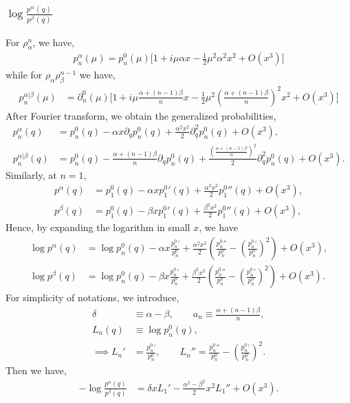 \documentclass[11pt]{article}
\newcommand{\p}{\partial}
\newcommand{\lb}{\left(}
\newcommand{\rb}{\right)}
\begin{document}
\subsubsection{\texorpdfstring{$\log \frac{p^\alpha(q)}{p^\beta(q)}$}{ log p alpha / p beta}}
For $\rho_\alpha^n$, we have,
\begin{align}
    p_n^\alpha(\mu) = p_n^0(\mu) \Big[ 1+ i\mu \alpha x - \frac{1}{2}\mu^2 \alpha^2 x^2 + O(x^3)\Big]
\end{align}
while for $\rho_\alpha\rho_\beta^{n-1}$ we have,
\begin{align}
    p_n^{\alpha|\beta}(\mu) &= \p_n^0(\mu) \Big[ 1+ i\mu \frac{\alpha + (n-1)\beta}{n}x - \frac{1}{2}\mu^2\lb\frac{\alpha + (n-1)\beta}{n}\rb^2x^2 + O(x^3)\Big]
\end{align}
After Fourier transform, we obtain the generalized probabilities,
\begin{align}
    p_n^\alpha(q) &= p_n^0(q) - \alpha x\p_qp_n^0(q)+ \frac{\alpha^2 x^2}{2}\p_q^2p_n^0(q) + O(x^3), \\
    p_n^{\alpha|\beta}(q) &= p_n^0(q) - \frac{\alpha + (n-1)\beta}{n}\p_qp_n^0(q) + \frac{\lb\frac{\alpha + (n-1)\beta}{n}\rb^2}{2} \p_q^2p_n^0(q) + O(x^3).
\end{align}
Similarly, at $n=1$, 
\begin{align}
    p^\alpha(q) &= p_1^0(q) - \alpha x p_1^0{'}(q)+ \frac{\alpha^2 x^2}{2}p_1^0{''}(q) + O(x^3),
    \\
    p^\beta(q) &= p_1^0(q) - \beta x p_1^0{'}(q)+ \frac{\beta^2 x^2}{2}p_1^0{''}(q) + O(x^3),
\end{align}
Hence, by expanding the logarithm in small $x$, we have
\begin{align}
    \log p^\alpha(q) &= \log p_n^0(q) - \alpha x \frac{p_n^0{'}}{p_n^0} + \frac{\alpha^2x^2}{2}\lb\frac{p_n^0{''}}{p_n^0} - \lb\frac{p_n^0{'}}{p_n^0}\rb^2 \rb + O(x^3),\\
    \log p^\beta(q) &= \log p_n^0(q) - \beta x \frac{p_n^0{'}}{p_n^0} + \frac{\beta^2x^2}{2}\lb\frac{p_n^0{''}}{p_n^0} - \lb\frac{p_n^0{'}}{p_n^0}\rb^2 \rb + O(x^3).
\end{align}
For simplicity of notations, we introduce,
\begin{align}
    \delta &\equiv \alpha - \beta,\qquad a_n \equiv \frac{\alpha + (n-1)\beta}{n},  \\ L_n(q) &\equiv \log p_n^0(q),
    \\
    \implies L_n'&= \frac{p_n^0{'}}{p_n^0} , \qquad L_n'' = \frac{p_n^0{''}}{p_n^0} - \lb\frac{p_n^0{'}}{p_n^0}\rb^2 .
\end{align}
Then we have,
\begin{align}
    -\log \frac{p^\alpha(q)}{p^\beta(q)} &= \delta x L_1' - \frac{\alpha^2-\beta^2}{2}x^2L_1'' + O(x^3).
\end{align}
\end{document}
